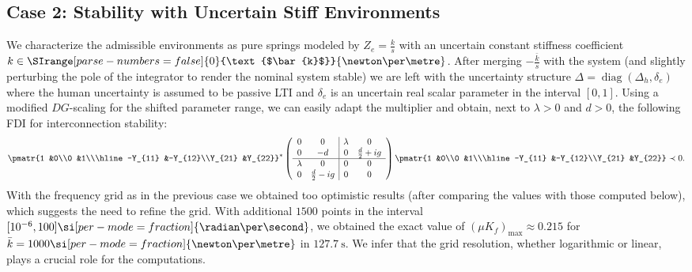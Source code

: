 \subsection{Case 2: Stability with Uncertain Stiff Environments}\label{sec:numcase2}
We characterize the admissible environments as pure springs modeled by
$Z_e = \frac{k}{s}$ with an uncertain constant stiffness coefficient 
$k\in\SIrange[parse-numbers = false]{0}{\text{$\bar{k}$}}{\newton\per\metre}$. After merging $-\frac{\bar{k}}{s}$ with the 
system (and slightly perturbing the pole of the integrator to render the nominal system 
stable) we are left with the uncertainty structure $\Delta = \operatorname{diag}(\Delta_h, 
\delta_e )$ where the human uncertainty is assumed to be passive LTI and $\delta_e$ is an 
uncertain real scalar parameter in the interval $[0,1]$. Using a modified $DG$-scaling for 
the shifted parameter range, we can easily adapt the multiplier and obtain, next to 
$\lambda>0$ and $d>0$, the following FDI for interconnection stability:
\begin{equation}%
\pmatr{1 &0\\0 &1\\\hline-Y_{11} &-Y_{12}\\Y_{21} &Y_{22}}^*
\left(\begin{array}{cc|cc}
      0&0  &\lambda &0 \\
      0&-d  &0         &\frac{d}{2} + ig\\ \hline
      \lambda &0 &0 &0\\
      0 &\frac{d}{2} - ig&0 &0
\end{array}\right)
\pmatr{1 &0\\0 &1\\\hline-Y_{11} &-Y_{12}\\Y_{21} &Y_{22}} \prec 0.
\label{eq:uncenvFDI}
\end{equation}
With the frequency grid as in the previous case we obtained too optimistic results (after 
comparing the values with those computed below), which suggests the need to refine the grid.
With additional  $1500$ points in the interval $[10^{-6},100]\si[per-mode=fraction]{\radian\per\second}$,
we obtained the exact value of $(\mu K_f)_\text{max}\approx 0.215$ for 
$\bar{k}=1000\si[per-mode=fraction]{\newton\per\metre}$ in $\SI{127.7}{\second}$. 
We infer that the grid resolution, whether logarithmic or linear, plays a crucial role 
for the computations.

